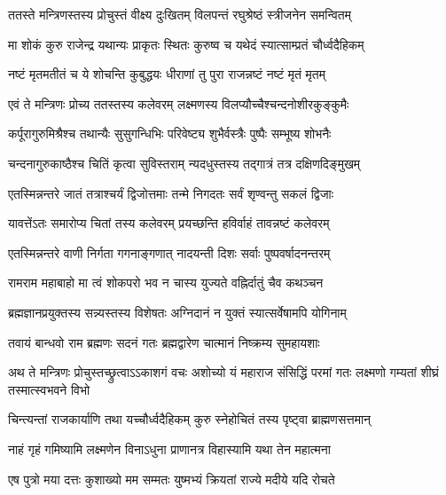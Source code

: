 \twolineshloka
{ततस्ते मन्त्रिणस्तस्य प्रोचुस्तं वीक्ष्य दुःखितम्}
{विलपन्तं रघुश्रेष्ठं स्त्रीजनेन समन्वितम्}%


\twolineshloka
{मा शोकं कुरु राजेन्द्र यथान्यः प्राकृतः स्थितः}
{कुरुष्व च यथेदं स्यात्साम्प्रतं चौर्ध्वदैहिकम्}%

\twolineshloka
{नष्टं मृतमतीतं च ये शोचन्ति कुबुद्धयः}
{धीराणां तु पुरा राजन्नष्टं नष्टं मृतं मृतम्}%

\twolineshloka
{एवं ते मन्त्रिणः प्रोच्य ततस्तस्य कलेवरम्}
{लक्ष्मणस्य विलप्यौच्चैश्चन्दनोशीरकुङ्कुमैः}%

\twolineshloka
{कर्पूरागुरुमिश्रैश्च तथान्यैः सुसुगन्धिभिः}
{परिवेष्ट्य शुभैर्वस्त्रैः पुष्पैः सम्भूष्य शोभनैः}%

\twolineshloka
{चन्दनागुरुकाष्ठैश्च चितिं कृत्वा सुविस्तराम्}
{न्यदधुस्तस्य तद्गात्रं तत्र दक्षिणदिङ्मुखम्}%

\twolineshloka
{एतस्मिन्नन्तरे जातं तत्राश्चर्यं द्विजोत्तमाः}
{तन्मे निगदतः सर्वं शृण्वन्तु सकलं द्विजाः}%

\twolineshloka
{यावत्तेंऽतः समारोप्य चितां तस्य कलेवरम्}
{प्रयच्छन्ति हविर्वाहं तावन्नष्टं कलेवरम्}%

\twolineshloka
{एतस्मिन्नन्तरे वाणी निर्गता गगनाङ्गणात्}
{नादयन्ती दिशः सर्वाः पुष्पवर्षादनन्तरम्}%

\twolineshloka
{रामराम महाबाहो मा त्वं शोकपरो भव}
{न चास्य युज्यते वह्निर्दातुं चैव कथञ्चन}%

\twolineshloka
{ब्रह्मज्ञानप्रयुक्तस्य सन्न्यस्तस्य विशेषतः}
{अग्निदानं न युक्तं स्यात्सर्वेषामपि योगिनाम्}%

\twolineshloka
{तवायं बान्धवो राम ब्रह्मणः सदनं गतः}
{ब्रह्मद्वारेण चात्मानं निष्क्रम्य सुमहायशाः}%

\threelineshloka
{अथ ते मन्त्रिणः प्रोचुस्तच्छ्रुत्वाऽऽकाशगं वचः}
{अशोच्यो यं महाराज संसिद्धिं परमां गतः}
{लक्ष्मणो गम्यतां शीघ्रं तस्मात्स्वभवने विभो}%

\twolineshloka
{चिन्त्यन्तां राजकार्याणि तथा यच्चौर्ध्वदैहिकम्}
{कुरु स्नेहोचितं तस्य पृष्ट्वा ब्राह्मणसत्तमान्}%


\twolineshloka
{नाहं गृहं गमिष्यामि लक्ष्मणेन विनाऽधुना}
{प्राणानत्र विहास्यामि यथा तेन महात्मना}%

\twolineshloka
{एष पुत्रो मया दत्तः कुशाख्यो मम सम्मतः}
{युष्मभ्यं क्रियतां राज्ये मदीये यदि रोचते}%

